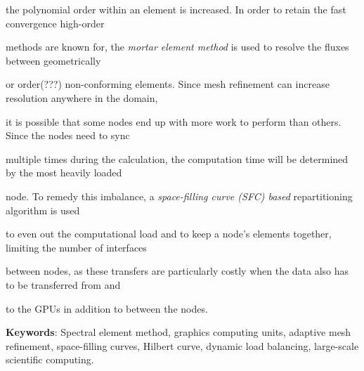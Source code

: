 the polynomial order within an element is increased. In order to retain the fast convergence high-order 

methods are known for, the \textit{mortar element method} is used to resolve the fluxes between geometrically

or order(???) non-conforming elements. Since mesh refinement can increase resolution anywhere in the domain, 

it is possible that some nodes end up with more work to perform than others. Since the nodes need to sync 

multiple times during the calculation, the computation time will be determined by the most heavily loaded

node. To remedy this imbalance, a \textit{space-filling curve (SFC) based} repartitioning algorithm is used

to even out the computational load and to keep a node's elements together, limiting the number of interfaces

between nodes, as these transfers are particularly costly when the data also has to be transferred from and 

to the GPUs in addition to between the nodes.



\textbf{Keywords}: Spectral element method, graphics computing units, adaptive mesh refinement, space-filling curves, Hilbert curve, dynamic load balancing, large-scale scientific computing.

 